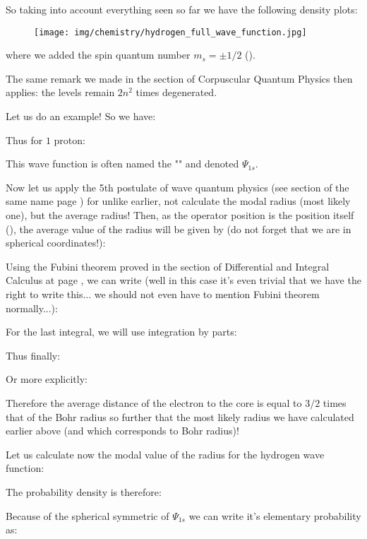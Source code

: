 	
	So taking into account everything seen so far we have the following density plots:
	\begin{figure}[H]
		\centering
		\texttt{[image: img/chemistry/hydrogen\_full\_wave\_function.jpg]}	
	\end{figure}
	
	where we added the spin quantum number $m_s=\pm 1/2$ ().

	The same remark we made in the section of Corpuscular Quantum Physics then applies: the levels remain $2n^2$ times degenerated.

	Let us do an example! So we have:
	
	Thus for $1$ proton:
	
	This wave function is often named the "" and denoted $\Psi_{1s}$.
	
	Now let us apply the 5th postulate of wave quantum physics (see section of the same name page \pageref{fifth postulate of wave quantum physics}) for unlike earlier, not calculate the modal radius (most likely one), but the average radius! Then, as the operator position is the position itself (), the average value of the radius will be given by (do not forget that we are in spherical coordinates!):
	
	Using the Fubini theorem proved in the section of Differential and Integral Calculus at page \pageref{fubini theorem}, we can write (well in this case it's even trivial that we have the right to write this... we should not even have to mention Fubini theorem normally...):
	
	For the last integral, we will use integration by parts:
	
	Thus finally:
	
	Or more explicitly:
	
	Therefore the average distance of the electron to the core is equal to $3/2$ times that of the Bohr radius so further that the most likely radius we have calculated earlier above (and which corresponds to Bohr radius)!
	
	Let us calculate now the modal value of the radius for the hydrogen wave function:
	
	The probability density is therefore:
	
	Because of the spherical symmetric of $\Psi_{1s}$ we can write it's elementary probability as:
	
